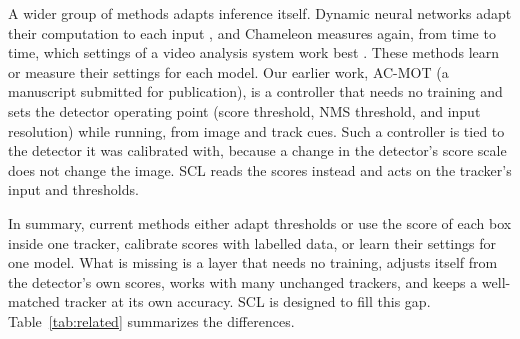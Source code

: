 \documentclass[pdflatex,sn-mathphys-num,iicol]{sn-jnl}
\newcommand{\scl}{SCL}
\begin{document}
A wider group of methods adapts inference itself. Dynamic neural networks
adapt their computation to each input \cite{han2022dynamic}, and Chameleon
measures again, from time to time, which settings of a video analysis system
work best \cite{jiang2018chameleon}. These methods learn or measure their
settings for each model. Our earlier work, AC-MOT (a manuscript submitted for publication), is a controller that
needs no training and sets the detector operating point (score threshold,
NMS threshold, and input resolution) while running, from image and track
cues. Such a controller is tied to the detector it was calibrated with,
because a change in the detector's score scale does not change the image.
\scl{} reads the scores instead and acts on the tracker's input and
thresholds.

In summary, current methods either adapt thresholds or use the score of each
box inside one tracker, calibrate scores with labelled data, or learn their
settings for one model. What is missing is a layer that needs no training, adjusts itself
from the detector's own scores, works with many unchanged trackers, and keeps
a well-matched tracker at its own accuracy. \scl{} is designed to fill this
gap. Table~\ref{tab:related} summarizes the differences.
\end{document}

